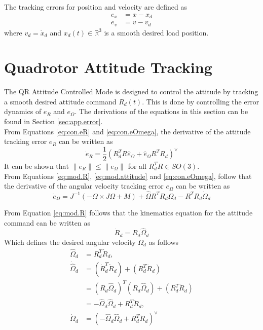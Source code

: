 The tracking errors for position and velocity are defined as
\begin{align}\label{key}
e_x&=x-x_d\\
e_v&=v-v_d
\end{align}
where $ v_d=\dot{x}_d $ and $ x_d(t) \in \mathbb{R}^3$ is a smooth desired load position.

\section{Quadrotor Attitude Tracking}\label{sec:con.qratt}
The QR Attitude Controlled Mode is designed to control the  attitude by tracking a smooth desired  attitude command $ R_d(t) $.
This is done by controlling the error dynamics of $ e_R $ and $ e_\Omega $. The derivations of the equations in this section can be found in Section \ref{sec:app.error}.\\
From Equations \ref{eq:con.eR} and \ref{eq:con.eOmega}, the derivative of the attitude tracking error $ e_R $ can be written as
\begin{equation}\label{key}
\dot{e}_R=\frac{1}{2}(R_d^TR\hat{e}_\Omega+\hat{e}_\Omega R^TR_d)^\vee
\end{equation}
It can be shown that $ \parallel\dot{e}_R\parallel\leq\parallel e_\Omega \parallel  $ for all $ R^T_dR\in SO(3) $.\\
From Equations \ref{eq:mod.R}, \ref{eq:mod.attitude} and \ref{eq:con.eOmega}, follow that the derivative of the angular velocity tracking error $ e_\Omega $ can be written as 
\begin{equation}\label{eq:con.deOmega}
\dot{e}_\Omega=J^{-1}(-\Omega\times J\Omega + M)+\hat{\Omega}R^TR_d\Omega_d-R^TR_d\dot{\Omega}_d
\end{equation}

From Equation \ref{eq:mod.R} follows that the kinematics equation for the attitude command can be written as
\begin{equation}\label{eq:con.dotRd}
\dot{R}_d=R_d\hat{\Omega}_d
\end{equation}
Which defines the desired angular velocity $ \dot{\Omega}_d $ as follows
\begin{equation}\label{key}
\begin{aligned}
\hat{\Omega}_d&=R_d^T\dot{R}_d,\\
\dot{\hat{\Omega}}_d&=(\dot{R}_d^T\dot{R}_d)+(R_d^T\ddot{R}_d)\\
&=(R_d\hat{\Omega}_d)^T(R_d\hat{\Omega}_d)+(R_d^T\ddot{R}_d)\\
&=-\hat{\Omega}_d\hat{\Omega}_d+R_d^T\ddot{R}_d,\\
\dot{\Omega}_d&=(-\hat{\Omega}_d\hat{\Omega}_d+R_d^T\ddot{R}_d)^\vee
\end{aligned}
\end{equation}

